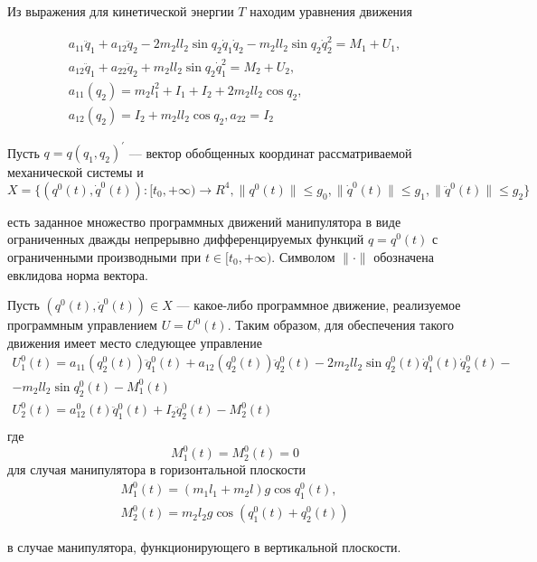 Из выражения для кинетической энергии $T$ находим уравнения движения

\begin{equation}
\begin{array}{l}
a_{11} \ddot q_1 + a_{12} \ddot q_2 - 2 m_2 l l_2 \sin q_2 \dot q_1 \dot q_2 - m_2 l l_2 \sin q_2 \dot q_2^2 = M_1 + U_1,\\ 
a_{12} \ddot q_1 + a_{22} \ddot q_2 + m_2 l l_2 \sin q_2 \dot q_1^2 = M_2 + U_2,\\
a_{11} (q_2) = m_2 l_1^2 + I_1 + I_2 + 2 m_2 l l_2 \cos q_2,\\
a_{12} (q_2)= I_2 + m_2 l l_2 \cos q_2, a_{22} = I_2
\end{array}
\end{equation}

Пусть $q=q(q_1, q_2)^{'}$ --– вектор обобщенных координат рассматриваемой механической системы и 
$$X = \{(q^0(t), \dot q^0(t)) : [t_0, + \infty) \to R^4, \|q^0(t)\| \le g_0, \|\dot q^0(t) \| \le g_1, \|\ddot q^0(t)\| \le g_2 \}$$

есть заданное множество программных движений манипулятора в виде ограниченных дважды непрерывно дифференцируемых функций $q=q^0(t)$ с ограниченными производными при $t \in [t_0, + \infty).$ Символом $\| \cdot \|$   обозначена евклидова норма вектора.

Пусть $(q^0(t), \dot q^0(t)) \in X$ --- какое-либо программное движение, реализуемое программным управлением $U = U^0(t).$ Таким образом, для обеспечения такого движения имеет место следующее управление
$$
\begin{array}{l}
U_1^0 (t) = a_{11} (q_2^0 (t)) \ddot q_1^0 (t) + a_{12} (q_2^0 (t)) \ddot q_2^0 (t) - 2 m_2 l l_2 \sin q_2^0 (t) \dot q_1^0 (t) \dot q_2^0 (t) - \\ 
- m_2 l l_2 \sin q_2^0 (t) - M_1^0 (t) \\
U_2^0 (t) = a_{12}^0 (t) \ddot q_1^0 (t) + I_2 \ddot q_2^0 (t) - M_2^0 (t) \\
\end{array}
$$
где $$M_1^0(t) = M_2^0(t) = 0$$ для случая манипулятора в горизонтальной плоскости
\begin{equation}
\begin{array}{l}
M_1^0 (t) = (m_1 l_1 + m_2 l) g \cos q_1^0 (t), \\
M_2^0 (t) = m_2 l_2 g \cos (q_1^0 (t) + q_2^0 (t))
\end{array}
\end{equation}

в случае манипулятора, функционирующего в вертикальной плоскости.

